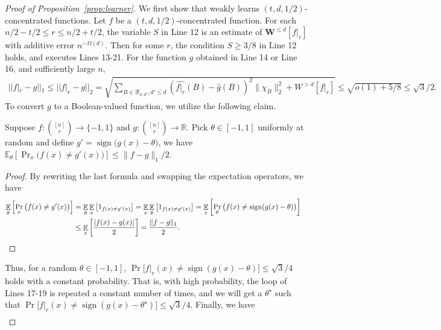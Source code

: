 \documentclass{toc}
\DeclareMathOperator*{\E}{\mathbb{E}}
\newcommand{\W}{\mathbf{W}}
\begin{document}
\begin{proof}[Proof of Proposition~\ref{prop:learner}]
We first show that  weakly learns $(t,d,1/2)$-concentrated functions. Let $f$ be a $(t,d,1/2)$-concentrated function. For each $n/2-t/2\leq r\leq n/2+t/2$, the variable $S$ in Line 12 is an estimate of $\W^{\leq d}[f|_r]$ with additive error $n^{-\Omega(d)}$. Then for some $r$, the condition $S\geq 3/8$ in Line 12 holds, and  executes Lines 13-21. 
For the function $g$ obtained in Line 14 or Line 16, and sufficiently large $n$, 
\begin{align*}
  ||f|_{r}-g||_1\leq ||f|_{r}-g||_2 = \sqrt{\sum_{B\in \mathcal{B}_{n,d'}, d'\leq d}{(\widehat{f|_{r}}(B)-\hat{g}(B))^2}\|\chi_B\|_2^2+W^{>d}[f|_{r}]}\leq \sqrt{o(1)+5/8}\leq \sqrt{3}/2.
\end{align*}
To convert $g$ to a Boolean-valued function, we utilize the following claim. 
\begin{claim}\label{lem:learn}
 Suppose $f:
 \binom{[n]}{r} %
 \rightarrow\{-1,1\}$ and $g:
 \binom{[n]}{r} %
 \rightarrow \mathbb{R}$. Pick $\theta \in [-1,1]$ uniformly at random and define $g'=\operatorname{sign}\big(g(x)-\theta\big)$, we have $\mathbb{E}_\theta\left[\Pr_x\big(f(x)\neq g'(x)\big)\right]\leq \|f-g\|_1/2$.
\end{claim}
\begin{proof} By rewriting the last formula and swapping the expectation operators, we have
\begin{equation*}
     \begin{aligned}
        \E_\theta \left[\Pr_x\big(f(x)\neq g'(x)\big)\right] &= \E_\theta \E_x \left[1_{f(x) \neq g'(x)}\right] = \E_x\E_\theta \left[1_{f(x) \neq g'(x)}\right]
        = \E_x\left[\Pr_\theta \big(f(x) \neq \operatorname{sign}(g(x)-\theta)\big)\right]\\
          &\leq\E_x\left[\frac{|f(x)-g(x)|}{2}\right]=\frac{\|f-g\|_1}{2}. & \qedhere
%
    \end{aligned}
\end{equation*}
\end{proof}
Thus, for a random $\theta\in[-1,1]$, $\Pr\big[f|_{r}(x)\neq \operatorname{sign}(g(x)-\theta)\big] \leq \sqrt{3}/4$ holds with a constant probability. That is, with high probability, the loop of Lines 17-19 is repeated a constant number of times, and we will get a $\theta^\star$ such that $\Pr\big[f|_{r}(x)\neq \operatorname{sign}(g(x)-\theta^\star)\big] \leq \sqrt{3}/4$. Finally, we have
%
%
\begin{align} %

\end{align}
\end{proof}
\end{document}
